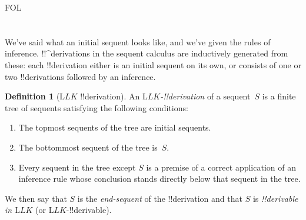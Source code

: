 \documentclass[10pt,a4paper]{article}
\theoremstyle{plain}
\theoremstyle{definition}
\newtheorem{defn}[thm]{Definition}
\theoremstyle{remark}
\newenvironment{explain}{}{}
\newcommand*{\olfileid}[3]{}
\newcommand*{\olsection}[1]{\section*{#1}}
\providecommand{\Log}{\ensuremath{\mathrm{L}}}
\providecommand{\iftag}[1]{#1}
\providecommand{\iftag}{}
\begin{document}



\iftag{FOL}
      {\olfileid{fol}{seq}{der}}
      {\olfileid{pl}{seq}{der}}

\olsection{}

\begin{explain}
We've said what an initial sequent looks like, and we've given the
rules of inference.  !!^{derivation}s in the sequent calculus are
inductively generated from these: each !!{derivation} either is an
initial sequent on its own, or consists of one or two !!{derivation}s
followed by an inference.
\end{explain}

\begin{defn}[$\Log{LK}$ !!{derivation}]
An \emph{$\Log{LK}$-!!{derivation}} of a sequent~$S$ is a finite tree
of sequents satisfying the following conditions:
\begin{enumerate}
\item The topmost sequents of the tree are initial sequents.
\item The bottommost sequent of the tree is~$S$.
\item Every sequent in the tree except $S$ is a premise of a correct
  application of an inference rule whose conclusion stands directly
  below that sequent in the tree.
\end{enumerate}
We then say that $S$ is the \emph{end-sequent} of the !!{derivation} and
that $S$ is \emph{!!{derivable} in $\Log{LK}$} (or $\Log{LK}$-!!{derivable}).
\end{defn}
\end{document}
